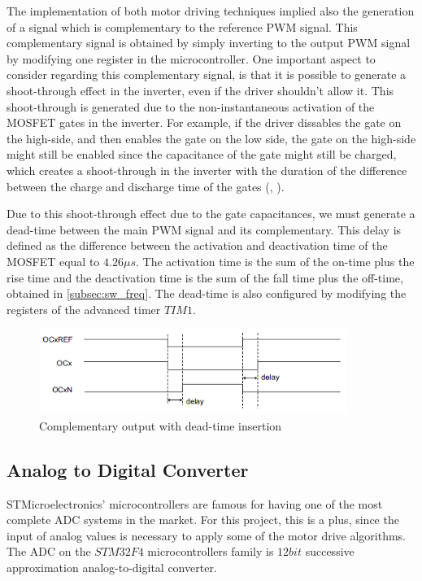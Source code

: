 The implementation of both motor driving techniques implied also the generation of a signal which is complementary to the reference \ac{PWM} signal. This complementary signal is obtained by simply inverting to the output \ac{PWM} signal by modifying one register in the microcontroller. One important aspect to consider regarding this complementary signal, is that it is possible to generate a shoot-through effect in the inverter, even if the driver shouldn't allow it. This shoot-through is generated due to the non-instantaneous activation of the \ac{MOSFET} gates in the inverter. For example, if the driver dissables the gate on the high-side, and then enables the gate on the low side, the gate on the high-side might still be enabled since the capacitance of the gate might still be charged, which creates a shoot-through in the inverter with the duration of the difference between the charge and discharge time of the gates (\citeauthor{maximShoot}, \citeyear{maximShoot}).

Due to this shoot-through effect due to the gate capacitances, we must generate a dead-time between the main \ac{PWM} signal and its complementary. This delay is defined as the difference between the activation and deactivation time of the \ac{MOSFET} equal to $4.26\mu s$. The activation time is the sum of the on-time plus the rise time and the deactivation time is the sum of the fall time plus the off-time, obtained in \ref{subsec:sw_freq}. The dead-time is also configured by modifying the registers of the advanced timer $TIM1$.

\begin{figure}[htbp]
\centering
\includegraphics[width=10cm]{Images/dead_time.png} 
\caption[Complementary output with dead-time insertion]{Complementary output with dead-time insertion}
\label{fig:dead_time}
\end{figure}

\subsection{Analog to Digital Converter}\label{sub:adc}

STMicroelectronics' microcontrollers are famous for having one of the most complete \ac{ADC} systems in the market. For this project, this is a plus, since the input of analog values is necessary to apply some of the motor drive algorithms. The \ac{ADC} on the $STM32F4$ microcontrollers family is $12bit$ successive approximation analog-to-digital converter.

